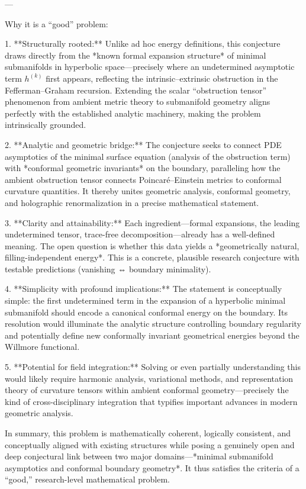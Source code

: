 ---

Why it is a “good” problem:  

1. **Structurally rooted:**  
   Unlike ad hoc energy definitions, this conjecture draws directly from the *known formal expansion structure* of minimal submanifolds in hyperbolic space—precisely where an undetermined asymptotic term \(h^{(k)}\) first appears, reflecting the intrinsic–extrinsic obstruction in the Fefferman–Graham recursion.  
   Extending the scalar “obstruction tensor” phenomenon from ambient metric theory to submanifold geometry aligns perfectly with the established analytic machinery, making the problem intrinsically grounded.

2. **Analytic and geometric bridge:**  
   The conjecture seeks to connect PDE asymptotics of the minimal surface equation (analysis of the obstruction term) with *conformal geometric invariants* on the boundary, paralleling how the ambient obstruction tensor connects Poincaré–Einstein metrics to conformal curvature quantities.  
   It thereby unites geometric analysis, conformal geometry, and holographic renormalization in a precise mathematical statement.

3. **Clarity and attainability:**  
   Each ingredient—formal expansions, the leading undetermined tensor, trace-free decomposition—already has a well-defined meaning. The open question is whether this data yields a *geometrically natural, filling-independent energy*. This is a concrete, plausible research conjecture with testable predictions (vanishing ⇔ boundary minimality).

4. **Simplicity with profound implications:**  
   The statement is conceptually simple: the first undetermined term in the expansion of a hyperbolic minimal submanifold should encode a canonical conformal energy on the boundary. Its resolution would illuminate the analytic structure controlling boundary regularity and potentially define new conformally invariant geometrical energies beyond the Willmore functional.

5. **Potential for field integration:**  
   Solving or even partially understanding this would likely require harmonic analysis, variational methods, and representation theory of curvature tensors within ambient conformal geometry—precisely the kind of cross-disciplinary integration that typifies important advances in modern geometric analysis.

In summary, this problem is mathematically coherent, logically consistent, and conceptually aligned with existing structures while posing a genuinely open and deep conjectural link between two major domains—*minimal submanifold asymptotics and conformal boundary geometry*.  
It thus satisfies the criteria of a “good,” research-level mathematical problem.